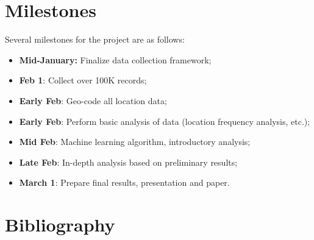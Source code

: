 \documentclass[conference]{IEEEtran}
\begin{document}
\section{Milestones}
Several milestones for the project are as follows:
\begin{itemize}
    \item \textbf{Mid-January:} Finalize data collection framework;
    \item \textbf{Feb 1}: Collect over 100K records;
    \item \textbf{Early Feb}: Geo-code all location data;
    \item \textbf{Early Feb}: Perform basic analysis of data (location frequency analysis, etc.);
    \item \textbf{Mid Feb}: Machine learning algorithm, introductory analysis;
    \item \textbf{Late Feb}: In-depth analysis based on preliminary results;
    \item \textbf{March 1}: Prepare final results, presentation and paper.
\end{itemize}

\section{Bibliography}
%
%
\end{document}

